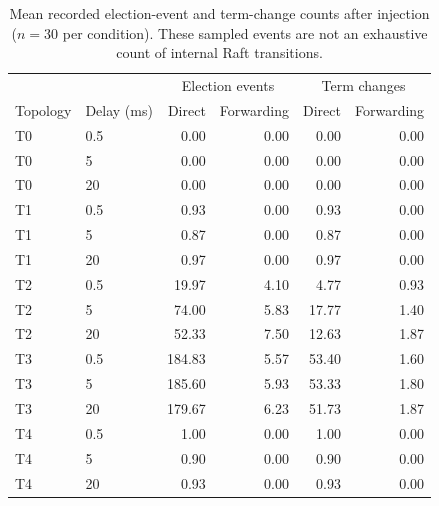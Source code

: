 \begin{table}[H]
  \centering
  \caption{Mean recorded election-event and term-change counts after injection ($n=30$ per condition). These sampled events are not an exhaustive count of internal Raft transitions.}
  \label{tab:events}
  \begin{tabular}{llrrrr}
    \toprule
    & & \multicolumn{2}{c}{Election events} & \multicolumn{2}{c}{Term changes} \\ Topology & Delay (ms) & Direct & Forwarding & Direct & Forwarding \\
    \midrule
    T0 & 0.5 & 0.00 & 0.00 & 0.00 & 0.00 \\
    T0 & 5 & 0.00 & 0.00 & 0.00 & 0.00 \\
    T0 & 20 & 0.00 & 0.00 & 0.00 & 0.00 \\
    T1 & 0.5 & 0.93 & 0.00 & 0.93 & 0.00 \\
    T1 & 5 & 0.87 & 0.00 & 0.87 & 0.00 \\
    T1 & 20 & 0.97 & 0.00 & 0.97 & 0.00 \\
    T2 & 0.5 & 19.97 & 4.10 & 4.77 & 0.93 \\
    T2 & 5 & 74.00 & 5.83 & 17.77 & 1.40 \\
    T2 & 20 & 52.33 & 7.50 & 12.63 & 1.87 \\
    T3 & 0.5 & 184.83 & 5.57 & 53.40 & 1.60 \\
    T3 & 5 & 185.60 & 5.93 & 53.33 & 1.80 \\
    T3 & 20 & 179.67 & 6.23 & 51.73 & 1.87 \\
    T4 & 0.5 & 1.00 & 0.00 & 1.00 & 0.00 \\
    T4 & 5 & 0.90 & 0.00 & 0.90 & 0.00 \\
    T4 & 20 & 0.93 & 0.00 & 0.93 & 0.00 \\
    \bottomrule
  \end{tabular}
\end{table}
